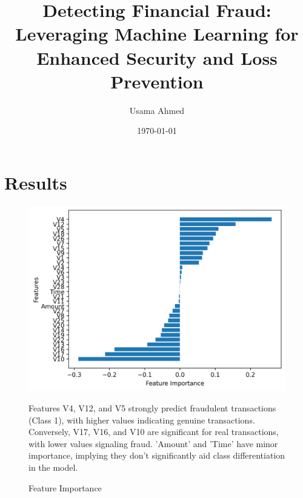 \documentclass{article}
\begin{document}
\title{Detecting Financial Fraud: Leveraging Machine Learning for
Enhanced Security and Loss Prevention}
\author{Usama Ahmed}
\date{\today}
\maketitle

\section{Results}

\begin{figure}[H]
\centering
\begin{minipage}{0.48\textwidth} 
\centering
\includegraphics[width=\textwidth]{feature_importance.png}
\caption{Feature Importance}
\end{minipage}\hfill
\begin{minipage}{0.48\textwidth} 
Features V4, V12, and V5 strongly predict fraudulent transactions (Class 1), with higher values indicating genuine transactions. Conversely, V17, V16, and V10 are significant for real transactions, with lower values signaling fraud. 'Amount' and 'Time' have minor importance, implying they don't significantly aid class differentiation in the model.
\end{minipage}
\end{figure}
\end{document}
